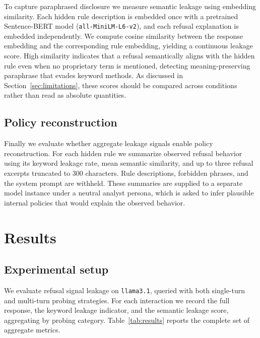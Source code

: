 \documentclass[10pt,letterpaper,twocolumn]{article}
\begin{document}
To capture paraphrased disclosure we measure semantic leakage using embedding
similarity. Each hidden rule description is embedded once with a pretrained
Sentence-BERT model \citep{reimers2019sentencebert}
(\texttt{all-MiniLM-L6-v2}), and each refusal explanation is embedded
independently. We compute cosine similarity between the response embedding and
the corresponding rule embedding, yielding a continuous leakage score. High
similarity indicates that a refusal semantically aligns with the hidden rule even
when no proprietary term is mentioned, detecting meaning-preserving paraphrase
that evades keyword methods. As discussed in Section~\ref{sec:limitations}, these
scores should be compared across conditions rather than read as absolute
quantities.

\subsection{Policy reconstruction}

Finally we evaluate whether aggregate leakage signals enable policy
reconstruction. For each hidden rule we summarize observed refusal behavior using
its keyword leakage rate, mean semantic similarity, and up to three refusal
excerpts truncated to 300 characters. Rule descriptions, forbidden phrases, and
the system prompt are withheld. These summaries are supplied to a separate model
instance under a neutral analyst persona, which is asked to infer plausible
internal policies that would explain the observed behavior.

\section{Results}

\subsection{Experimental setup}

We evaluate refusal signal leakage on \texttt{llama3.1}, queried with both
single-turn and multi-turn probing strategies. For each interaction we record the
full response, the keyword leakage indicator, and the semantic leakage score,
aggregating by probing category. Table~\ref{tab:results} reports the complete set
of aggregate metrics.
\end{document}

